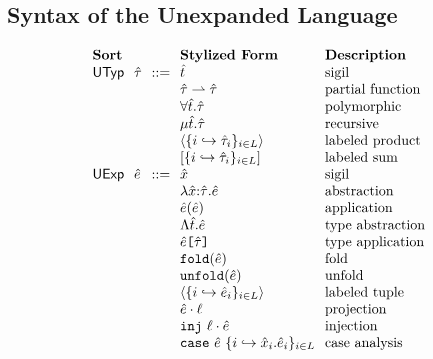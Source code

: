 \subsection{Syntax of the Unexpanded Language}\label{sec:syntax-U}
\begin{figure}
\[\arraycolsep=3.5pt\begin{array}{lllllll}
\textbf{Sort} & &  
& \textbf{Stylized Form} & \textbf{Description}\\
\mathsf{UTyp} & \utau & ::= 
& \ut & \text{sigil}\\
&& 
& \parr{\utau}{\utau} & \text{partial function}\\
&&
& \forallt{\ut}{\utau} & \text{polymorphic}\\
&&
& \rect{\ut}{\utau} & \text{recursive}\\
&&
& \prodt{\mapschema{\utau}{i}{\labelset}} & \text{labeled product}\\
&&
& \sumt{\mapschema{\utau}{i}{\labelset}} & \text{labeled sum}\\
\mathsf{UExp} & \ue & ::= 
& \ux & \text{sigil}\\
&&
& \lam{\ux}{\utau}{\ue} & \text{abstraction}\\
&&
& \ap{\ue}{\ue} & \text{application}\\
&&
& \Lam{\ut}{\ue} & \text{type abstraction}\\
&&
& \App{\ue}{\utau} & \text{type application}\\
&&
& \fold{\ue} & \text{fold}\\
&&
& \unfold{\ue} & \text{unfold}\\
&&
& \tpl{\mapschema{\ue}{i}{\labelset}} & \text{labeled tuple}\\
&&
& \prj{\ue}{\ell} & \text{projection}\\
&&
& \inj{\ell}{\ue} & \text{injection}\\
&&
& \caseof{\ue}{\mapschemab{\ux}{\ue}{i}{\labelset}} & \text{case analysis}\\

\end{array}\]
\end{figure}
